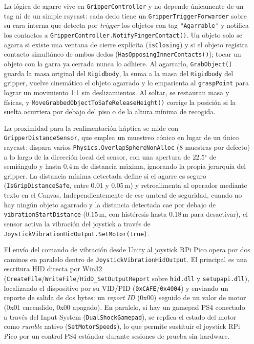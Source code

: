 \documentclass[12pt]{article}
\begin{document}
La lógica de agarre vive en \texttt{GripperController} y no depende únicamente de un tag ni de un simple raycast: cada dedo tiene un \texttt{GripperTriggerForwarder} sobre su cara interna que detecta por \textit{trigger} los objetos con tag \texttt{"Agarrable"} y notifica los contactos a \texttt{GripperController.\allowbreak NotifyFingerContact()}. Un objeto solo se agarra si existe una ventana de cierre explícita (\texttt{isClosing}) y si el objeto registra contacto simultáneo de ambos dedos (\texttt{HasOpposingInnerContacts()}); tocar un objeto con la garra ya cerrada nunca lo adhiere. Al agarrarlo, \texttt{GrabObject()} guarda la masa original del \texttt{Rigidbody}, la suma a la masa del \texttt{Rigidbody} del gripper, vuelve cinemático el objeto agarrado y lo emparienta al \texttt{graspPoint} para lograr un movimiento 1:1 sin deslizamientos. Al soltar, se restauran masa y físicas, y \texttt{MoveGrabbedObjectToSafeReleaseHeight()} corrige la posición si la suelta ocurriera por debajo del piso o de la altura mínima de recogida.

La proximidad para la realimentación háptica se mide con \texttt{GripperDistanceSensor}, que emplea un muestreo cónico en lugar de un único raycast: dispara varios \texttt{Physics.OverlapSphereNonAlloc} (8 muestras por defecto) a lo largo de la dirección local del sensor, con una apertura de $22.5{^\circ}$ de semiángulo y hasta 0.4\,m de distancia máxima, ignorando la propia jerarquía del gripper. La distancia mínima detectada define si el agarre es seguro (\texttt{IsGripDistanceSafe}, entre 0.01 y 0.05\,m) y retroalimenta al operador mediante texto en el Canvas. Independientemente de ese umbral de seguridad, cuando no hay ningún objeto agarrado y la distancia detectada cae por debajo de \texttt{vibrationStartDistance} (0.15\,m, con histéresis hasta 0.18\,m para desactivar), el sensor activa la vibración del joystick a través de \texttt{JoystickVibrationHidOutput.SetMotor(true)}.

El envío del comando de vibración desde Unity al joystick RPi Pico opera por dos caminos en paralelo dentro de \texttt{JoystickVibrationHidOutput}. El principal es una escritura HID directa por Win32 (\texttt{CreateFile}/\texttt{WriteFile}/\texttt{HidD\_SetOutputReport} sobre \texttt{hid.dll} y \texttt{setupapi.dll}), localizando el dispositivo por su VID/PID (\texttt{0xCAFE}/\texttt{0x4004}) y enviando un reporte de salida de dos bytes: un \textit{report ID} (0x00) seguido de un valor de motor (0x01 encendido, 0x00 apagado). En paralelo, si hay un gamepad PS4 conectado a través del Input System (\texttt{DualShockGamepad}), se replica el estado del motor como \textit{rumble} nativo (\texttt{SetMotorSpeeds}), lo que permite sustituir el joystick RPi Pico por un control PS4 estándar durante sesiones de prueba sin hardware.
\end{document}
